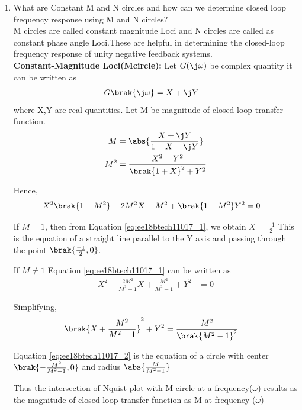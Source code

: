 \begin{enumerate}[label=\thesection.\arabic*.,ref=\thesection.\theenumi]

\item
What are Constant M and N circles and how can we determine closed loop frequency response using M and N circles? \\
\solution 
M circles are called constant magnitude Loci and N circles are called as
constant phase angle Loci.These are helpful in determining the closed-loop frequency response of unity negative feedback systems. \\

\textbf{Constant-Magnitude Loci(Mcircle):} Let $G(\j\omega)$ be complex quantity it can be written as 
\begin{align}
G\brak{\j \omega} &= X+\j Y
\end{align}
where X,Y are real quantities.
Let M be magnitude of closed loop transfer function.
\begin{align}
M &= \abs{\frac{X+\j Y}{1+X+\j Y}}
\\
M^{2} &= \frac{X^{2}+Y^{2}}{\brak{1+X}^{2}+Y^{2}}
\label{eq:ee18btech11017_3}
\end{align}

Hence,
\begin{align}
X^{2}\brak{1-M^{2}}-2M^{2}X-M^{2}+\brak{1-M^{2}}Y^{2} &= 0
\label{eq:ee18btech11017_1}
\end{align}

If $M=1$, then from Equation \eqref{eq:ee18btech11017_1}, we obtain $X =\frac{-1}{2}$ This is the equation of a straight line parallel to the Y axis and passing through the point $\brak{\frac{-1}{2},0}$.

If $M \neq 1$ Equation \eqref{eq:ee18btech11017_1} can be written as
\begin{align}
X^{2}+\frac{2M^{2}}{M^{2}-1}X+\frac{M^{2}}{M^{2}-1}+Y^{2} &= 0
\end{align}

Simplifying,
\begin{align}
\brak{X+\frac{M^{2}}{M^{2}-1}}^{2}+Y^{2} &= \frac{M^{2}}{\brak{M^{2}-1}^{2}}
\label{eq:ee18btech11017_2}
\end{align}

Equation \eqref{eq:ee18btech11017_2} is the equation of a circle with center 
$\brak{-\frac{M^{2}}{M^{2}-1},0}$ and radius $\abs{\frac{M}{M^{2}-1}}$

Thus the intersection of Nquist plot with M circle at a frequency($\omega$) results as the magnitude of closed loop transfer function as M at frequency ($\omega$)


\end{enumerate}
